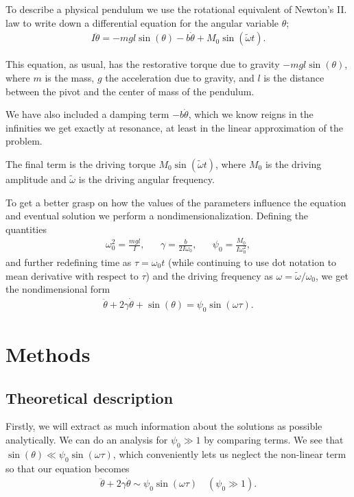 \documentclass[10pt,a4paper,twocolumn]{article}
\begin{document}
To describe a physical pendulum we use the rotational equivalent of Newton's II. law to write down a differential equation for the angular variable $\theta$;
%
\begin{align}
I \ddot{\theta} = -mgl \sin(\theta) - b \dot{\theta} + M_0 \sin(\tilde{\omega} t).
\end{align}

This equation, as usual, has the restorative torque due to gravity $-mgl\sin(\theta)$, where $m$ is the mass, $g$ the acceleration due to gravity, and $l$ is the distance between the pivot and the center of mass of the pendulum.

We have also included a damping term $-b \dot{\theta}$, which we know reigns in the infinities we get exactly at resonance, at least in the linear approximation of the problem.

The final term is the driving torque $M_0 \sin(\tilde{\omega} t)$, where $M_0$ is the driving amplitude and $\tilde{\omega}$ is the driving angular frequency.

To get a better grasp on how the values of the parameters influence the equation and eventual solution we perform a nondimensionalization. Defining the quantities
%
\begin{align}
&\omega_0^2 = \frac{mgl}{I},& &\gamma = \frac{b}{2I \omega_0},& &\psi_0 = \frac{M_0}{I \omega_0^2},&
\end{align}
%
and further redefining time as $\tau = \omega_0 t$ (while continuing to use dot notation to mean derivative with respect to $\tau$) and the driving frequency as $\omega = \tilde{\omega}/\omega_0$, we get the nondimensional form
%
\begin{align}
\ddot{\theta} + 2\gamma \dot{\theta} + \sin(\theta) = \psi_0 \sin(\omega \tau).
\end{align}\label{eq:diffeq}


\section{Methods}

\subsection{Theoretical description}

Firstly, we will extract as much information about the solutions as possible analytically. We can do an analysis for $\psi_0 \gg 1$ by comparing terms. We see that $\sin(\theta) \ll \psi_0 \sin(\omega \tau)$, which conveniently lets us neglect the non-linear term so that our equation becomes
%
\begin{align}
\ddot{\theta} + 2\gamma \dot{\theta} \sim \psi_0 \sin(\omega \tau) \quad (\psi_0 \gg 1).
\end{align}
\end{document}
